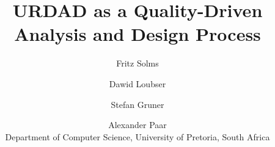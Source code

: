 \documentclass[11pt]{article}
\begin{document}
\title{URDAD as a Quality-Driven Analysis and Design Process}
\author{Fritz Solms \and Dawid Loubser \and Stefan Gruner \and Alexander Paar
\\ Department of Computer Science, University of Pretoria, South Africa}

\maketitle





















\end{document}
